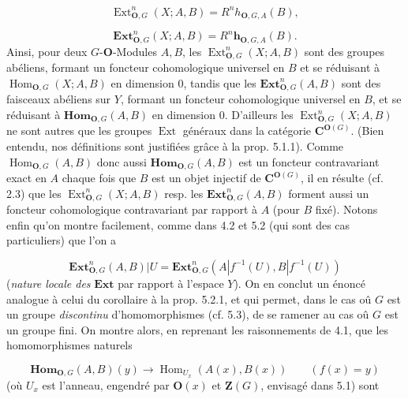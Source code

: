 \[
\tag{5.6.6}
\operatorname{Ext}_{{\mathbf O},G}^n(X;A,B)=R^n h_{{\mathbf O},G,A}(B),
\]

\[
\tag{5.6.7}
\mathbf{Ext}_{{\mathbf O},G}^n(X;A,B)=R^n\mathbf h_{{\mathbf O},G,A}(B).
\]
Ainsi, pour deux $G$-${\mathbf O}$-Modules $A,B$, les
$\operatorname{Ext}_{{\mathbf O},G}^n(X;A,B)$ sont des groupes abéliens, formant un
foncteur cohomologique universel en $B$ et se réduisant à
$\operatorname{Hom}_{{\mathbf O},G}(X;A,B)$ en dimension 0, tandis que les
$\mathbf{Ext}_{{\mathbf O},G}^n(A,B)$ sont des faisceaux abéliens sur $Y$, formant un
foncteur cohomologique universel en $B$, et se réduisant à
$\mathbf{Hom}_{{\mathbf O},G}(A,B)$ en dimension 0. D'ailleurs les
$\operatorname{Ext}_{{\mathbf O},G}^n(X;A,B)$ ne sont autres que les groupes $\operatorname{Ext}$
généraux dans la catégorie ${\mathbf C}^{{\mathbf O}(G)}$. (Bien entendu, nos définitions sont
justifiées grâce à la prop. 5.1.1). Comme $\operatorname{Hom}_{{\mathbf O},G}(A,B)$ donc
aussi $\mathbf{Hom}_{{\mathbf O},G}(A,B)$ est un foncteur contravariant exact en $A$
chaque fois que $B$ est un objet injectif de ${\mathbf C}^{{\mathbf O}(G)}$, il en résulte
(cf. 2.3) que les $\operatorname{Ext}_{{\mathbf O},G}^n(X;A,B)$ resp. les
$\mathbf{Ext}_{{\mathbf O},G}^n(A,B)$ forment aussi un foncteur cohomologique
contravariant par rapport à $A$ (pour $B$ fixé). Notons enfin qu'on montre
facilement, comme dans 4.2 et 5.2 (qui sont des cas particuliers) que l'on a

\[
\tag{5.6.8}
\mathbf{Ext}_{{\mathbf O},G}^n(A,B)|U
=\mathbf{Ext}_{{\mathbf O},G}^n(A|f^{-1}(U),B|f^{-1}(U))
\]
 (\textit{nature locale des} $\mathbf{Ext}$ par rapport à
l'espace $Y$). On en conclut un énoncé analogue à celui du corollaire à la
prop. 5.2.1, et qui permet, dans le cas oû $G$ est un groupe \textit{discontinu}
d'homomorphismes (cf. 5.3), de se ramener au cas oû $G$ est un groupe fini. On
montre alors, en reprenant les raisonnements de 4.1, que les homomorphismes
naturels

\[
\tag{5.6.9}
\mathbf{Hom}_{{\mathbf O},G}(A,B)(y)
\to \operatorname{Hom}_{U_x}(A(x),B(x))
\qquad (f(x)=y)
\]
 (où $U_x$ est l'anneau, engendré par ${\mathbf O}(x)$ et ${\mathbf Z}(G)$, envisagé
dans 5.1) sont

